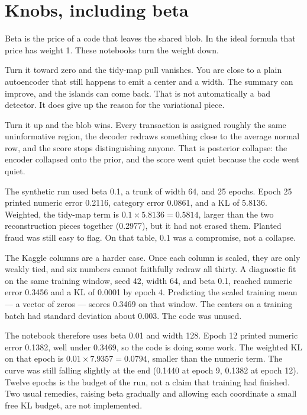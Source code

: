 \documentclass[11pt]{article}
\begin{document}
\section{Knobs, including beta}
\label{sec:knobs}

Beta is the price of a code that leaves the shared blob. In the ideal
formula that price has weight 1. These notebooks turn the weight down.

Turn it toward zero and the tidy-map pull vanishes. You are close to a
plain autoencoder that still happens to emit a center and a width.
The summary can improve, and the islands can come back. That is not
automatically a bad detector. It does give up the reason for the
variational piece.

Turn it up and the blob wins. Every transaction is assigned roughly the
same uninformative region, the decoder redraws something close to the
average normal row, and the score stops distinguishing anyone. That is
posterior collapse: the encoder collapsed onto the prior, and the score
went quiet because the code went quiet.

The synthetic run used beta 0.1, a trunk of width 64, and 25 epochs.
Epoch 25 printed numeric error 0.2116, category error 0.0861, and a KL
of 5.8136. Weighted, the tidy-map term is $0.1 \times 5.8136 = 0.5814$,
larger than the two reconstruction pieces together (0.2977), but it had
not erased them. Planted fraud was still easy to flag. On that table,
0.1 was a compromise, not a collapse.

The Kaggle columns are a harder case. Once each column is scaled, they
are only weakly tied, and six numbers cannot faithfully redraw all thirty.
A diagnostic fit on the same training window, seed 42, width 64, and
beta 0.1, reached numeric error 0.3456 and a KL of 0.0001 by epoch 4.
Predicting the scaled training mean --- a vector of zeros --- scores
0.3469 on that window. The centers on a training batch had standard
deviation about 0.003. The code was unused.

The notebook therefore uses beta 0.01 and width 128. Epoch 12 printed
numeric error 0.1382, well under 0.3469, so the code is doing some work.
The weighted KL on that epoch is $0.01 \times 7.9357 = 0.0794$, smaller
than the numeric term. The curve was still falling slightly at the end
(0.1440 at epoch 9, 0.1382 at epoch 12). Twelve epochs is the budget of
the run, not a claim that training had finished. Two usual remedies,
raising beta gradually and allowing each coordinate a small free KL
budget, are not implemented.
\end{document}
